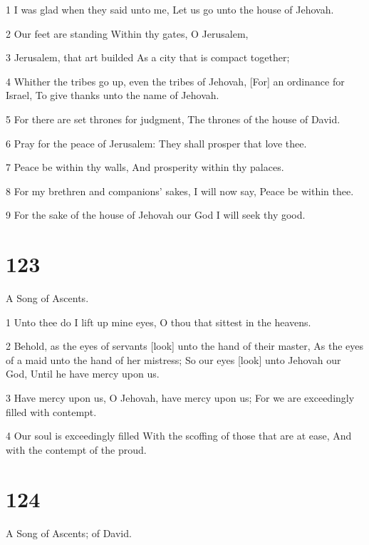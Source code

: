 \par 1 I was glad when they said unto me, Let us go unto the house of Jehovah.
\par 2 Our feet are standing Within thy gates, O Jerusalem,
\par 3 Jerusalem, that art builded As a city that is compact together;
\par 4 Whither the tribes go up, even the tribes of Jehovah, [For] an ordinance for Israel, To give thanks unto the name of Jehovah.
\par 5 For there are set thrones for judgment, The thrones of the house of David.
\par 6 Pray for the peace of Jerusalem: They shall prosper that love thee.
\par 7 Peace be within thy walls, And prosperity within thy palaces.
\par 8 For my brethren and companions' sakes, I will now say, Peace be within thee.
\par 9 For the sake of the house of Jehovah our God I will seek thy good.

\chapter{123}

\par A Song of Ascents.

\par 1 Unto thee do I lift up mine eyes, O thou that sittest in the heavens.
\par 2 Behold, as the eyes of servants [look] unto the hand of their master, As the eyes of a maid unto the hand of her mistress; So our eyes [look] unto Jehovah our God, Until he have mercy upon us.
\par 3 Have mercy upon us, O Jehovah, have mercy upon us; For we are exceedingly filled with contempt.
\par 4 Our soul is exceedingly filled With the scoffing of those that are at ease, And with the contempt of the proud.

\chapter{124}

\par A Song of Ascents; of David.

